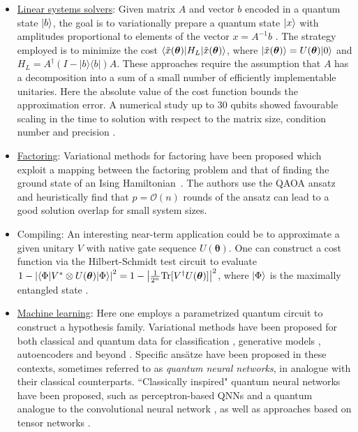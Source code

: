 \begin{refsection}
\begin{itemize}
%    
    \item \hyperref[prim:QuantumLinearSystemSolvers]{Linear systems solvers}: Given matrix $A$ and vector $b$ encoded in a quantum state $\lvert b\rangle$, the goal is to variationally prepare a quantum state $\lvert x\rangle$ with amplitudes proportional to elements of the vector $x=A^{-1}b$ \cite{bravo2020linearsystems,xu2019linearalgebra,huang2019linearsystems}. The strategy employed is to minimize the cost $\langle\tilde{x}(\boldsymbol{\theta})\rvert H_L\lvert\tilde{x}(\boldsymbol{\theta})\rangle$, where $\lvert\tilde{x}(\boldsymbol{\theta})\rangle = U(\boldsymbol{\theta})\lvert0\rangle$ and $H_L=A^{\dag}(I-|b\rangle\langle b|)A$. These approaches require the assumption that $A$ has a decomposition into a sum of a small number of efficiently implementable unitaries. Here the absolute value of the cost function bounds the approximation error. A numerical study up to $30$ qubits showed favourable scaling in the time to solution with respect to the matrix size, condition number and precision \cite{bravo2020linearsystems}.
    \item \hyperref[appl:BreakingCrypto]{Factoring}: Variational methods for factoring have been proposed which exploit a mapping between the factoring problem and that of finding the ground state of an Ising Hamiltonian~\cite{anschuetz2019variationalfactoring}. The authors use the QAOA ansatz and heuristically find that $p=\mathcal{O}(n)$ rounds of the ansatz can lead to a good solution overlap for small system sizes.
    \item Compiling: An interesting near-term application could be to approximate a given unitary $V$ with native gate sequence $U(\boldsymbol{\theta})$. One can construct a cost function via the Hilbert-Schmidt test circuit to evaluate $1-\left|\langle\Phi\rvert V^*\otimes U(\boldsymbol{\theta})\lvert\Phi\rangle\right|^2=1-\left|\frac{1}{2^{n}}\mathrm{Tr}[V^{\dag}U(\boldsymbol{\theta})]\right|^2$, where $\lvert\Phi\rangle$ is the maximally entangled state \cite{khatri2019qaqc}.
    \item \hyperref[appl:ClassicalML]{Machine learning}: Here one employs a parametrized quantum circuit to construct a hypothesis family. Variational methods have been proposed for both classical and quantum data for classification \cite{schuld2018CircuitCentricQuantclass, mitarai2018quantum, schuld2019qmlFeatureSpaces, havlivcek2019supervisedlearning, cong2019qcnn}, generative models \cite{verdon2017NNtrain, benedetti2019generative, du2020expressive}, autoencoders \cite{romero2017QAutoencoders, wan2017quantum, verdon2018universal} and beyond \cite{romero2021variationalgenerators, hubregtsen2021trainingKernels}. Specific ans\"atze have been proposed in these contexts, sometimes referred to as \textit{quantum neural networks}, in analogue with their classical counterparts. ``Classically inspired" quantum neural networks have been proposed, such as perceptron-based QNNs \cite{altaisky2001quantum, wan2017quantum, farhi2018ClassificationWQNeuralNet, beer2020training} and a quantum analogue to the convolutional neural network \cite{cong2019qcnn}, as well as approaches based on tensor networks \cite{grant2018hierarchical, huggins2019towards}. 
\end{itemize}


\end{refsection}
